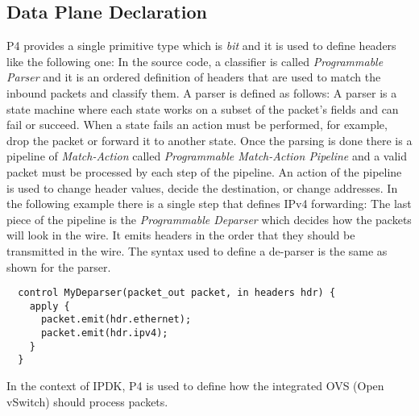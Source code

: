 \documentclass[../sn.tex]{subfiles}
\begin{document}
\subsection{Data Plane Declaration}
P4 provides a single primitive type which is \emph{bit} and it is used to define headers like the following one:
In the source code, a classifier is called \emph{Programmable Parser} and it is an ordered definition of headers that are used to match the inbound packets and classify them. A parser is defined as follows:
A parser is a state machine where each state works on a subset of the packet's fields and can fail or succeed. When a state fails an action must be performed, for example, drop the packet or forward it to another state.
Once the parsing is done there is a pipeline of \emph{Match-Action} called \emph{Programmable Match-Action Pipeline} and a valid packet must be processed by each step of the pipeline.
An action of the pipeline is used to change header values, decide the destination, or change addresses. In the following example there is a single step that defines IPv4 forwarding:
The last piece of the pipeline is the \emph{Programmable Deparser} which decides how the packets will look in the wire.
It emits headers in the order that they should be transmitted in the wire.
The syntax used to define a de-parser is the same as shown for the parser.
\begin{lstlisting}
  control MyDeparser(packet_out packet, in headers hdr) {
    apply {
      packet.emit(hdr.ethernet);
      packet.emit(hdr.ipv4);
    }
  }
\end{lstlisting}
In the context of IPDK, P4 is used to define how the integrated OVS (Open vSwitch) should process packets. 
\clearpage
\end{document}
